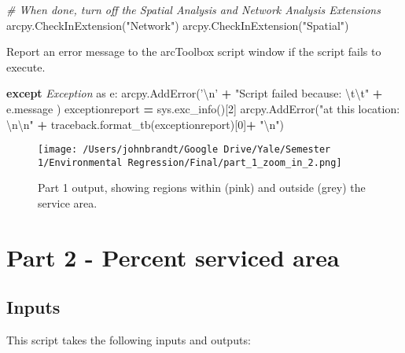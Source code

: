 \documentclass[11pt,]{article}
\newenvironment{Shaded}{\begin{snugshade}}{\end{snugshade}}
\newcommand{\DecValTok}[1]{\textcolor[rgb]{0.00,0.00,0.81}{{#1}}}
\newcommand{\CharTok}[1]{\textcolor[rgb]{0.31,0.60,0.02}{{#1}}}
\newcommand{\StringTok}[1]{\textcolor[rgb]{0.31,0.60,0.02}{{#1}}}
\newcommand{\ImportTok}[1]{{#1}}
\newcommand{\CommentTok}[1]{\textcolor[rgb]{0.56,0.35,0.01}{\textit{{#1}}}}
\newcommand{\ControlFlowTok}[1]{\textcolor[rgb]{0.13,0.29,0.53}{\textbf{{#1}}}}
\newcommand{\OperatorTok}[1]{\textcolor[rgb]{0.81,0.36,0.00}{\textbf{{#1}}}}
\newcommand{\PreprocessorTok}[1]{\textcolor[rgb]{0.56,0.35,0.01}{\textit{{#1}}}}
\newcommand{\NormalTok}[1]{{#1}}
\begin{document}
\begin{Shaded}
\begin{Highlighting}[]
    \CommentTok{# When done, turn off the Spatial Analysis and Network Analysis Extensions}
    \NormalTok{arcpy.CheckInExtension(}\StringTok{"Network"}\NormalTok{)}
    \NormalTok{arcpy.CheckInExtension(}\StringTok{"Spatial"}\NormalTok{)}
\end{Highlighting}
\end{Shaded}

\noindent Report an error message to the arcToolbox script window if the
script fails to execute.

\begin{Shaded}
\begin{Highlighting}[]
\ControlFlowTok{except} \PreprocessorTok{Exception} \ImportTok{as} \NormalTok{e:}
    \NormalTok{arcpy.AddError(}\StringTok{'}\CharTok{\textbackslash{}n}\StringTok{'} \OperatorTok{+} \StringTok{"Script failed because: }\CharTok{\textbackslash{}t\textbackslash{}t}\StringTok{"} \OperatorTok{+} \NormalTok{e.message )}
    \NormalTok{exceptionreport }\OperatorTok{=} \NormalTok{sys.exc_info()[}\DecValTok{2}\NormalTok{]}
    \NormalTok{arcpy.AddError(}\StringTok{"at this location: }\CharTok{\textbackslash{}n\textbackslash{}n}\StringTok{"} \OperatorTok{+}
    \NormalTok{traceback.format_tb(exceptionreport)[}\DecValTok{0}\NormalTok{]}\OperatorTok{+} \StringTok{"}\CharTok{\textbackslash{}n}\StringTok{"}\NormalTok{)}
\end{Highlighting}
\end{Shaded}

\begin{figure}[htbp]
\centering
\texttt{[image: /Users/johnbrandt/Google Drive/Yale/Semester 1/Environmental Regression/Final/part\_1\_zoom\_in\_2.png]}
\caption{Part 1 output, showing regions within (pink) and outside (grey)
the service area.}
\end{figure}

\pagebreak

\section{Part 2 - Percent serviced
area}\label{part-2---percent-serviced-area}

\subsection{Inputs}\label{inputs-1}

This script takes the following inputs and outputs:
\end{document}
